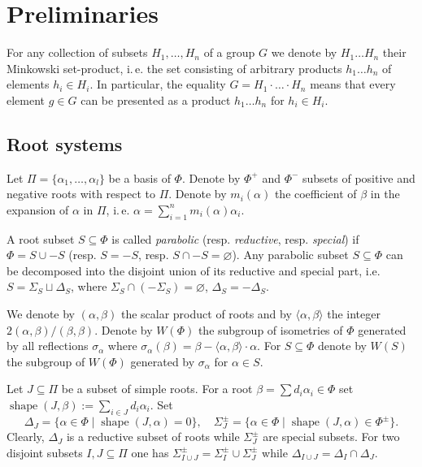 \documentclass[12pt]{amsart}
\numberwithin{equation}{section}
\theoremstyle{definition}
\DeclareMathOperator{\shape}{shape}
\begin{document}
\section{Preliminaries}\label{sec:prelim}
For any collection of subsets $H_1,\ldots, H_n$ of a group $G$ we denote by $H_1\ldots H_n$ their Minkowski set-product,
i.\,e. the set consisting of arbitrary products $h_1\ldots h_n$ of elements $h_i\in H_i$. In particular, the equality
$G = H_1\cdot\ldots\cdot H_n$ means that every element $g\in G$ can be presented as a product $h_1\ldots h_n$ for $h_i\in H_i$.

\subsection{Root systems}\label{sec:rootsys}
Let $\Pi=\{\alpha_1, \ldots, \alpha_l\}$ be a basis of $\Phi$. Denote by $\Phi^+$ and $\Phi^-$ subsets of positive and negative roots with respect to $\Pi$.
Denote by $m_i(\alpha)$ the coefficient of $\beta$ in the expansion of $\alpha$ in $\Pi$, i.\,e. $\alpha = \sum_{i=1}^n m_i(\alpha) \alpha_i$.

A root subset $S\subseteq \Phi$ is called {\it parabolic} (resp. {\it reductive}, resp. {\it special}) if $\Phi=S \cup -S$ (resp. $S = -S$, resp. $S \cap -S=\varnothing$).
Any parabolic subset $S \subseteq \Phi$ can be decomposed into the disjoint union of its reductive and special part, i.e. 
$S = \Sigma_S \sqcup \Delta_S$, where $\Sigma_S \cap (-\Sigma_S) = \varnothing$, $\Delta_S = -\Delta_S$.

We denote by $(\alpha, \beta)$ the scalar product of roots and by $\langle \alpha, \beta\rangle$ the integer $2(\alpha, \beta)/(\beta, \beta)$.
Denote by $W(\Phi)$ the subgroup of isometries of $\Phi$ generated by all reflections $\sigma_\alpha$ where $\sigma_\alpha(\beta)=\beta-\langle\alpha,\beta \rangle\cdot \alpha$.
For $S\subseteq \Phi$ denote by $W(S)$ the subgroup of $W(\Phi)$ generated by $\sigma_\alpha$ for $\alpha\in S$.

Let $J\subseteq \Pi$ be a subset of simple roots. 
For a root $\beta = \sum d_i\alpha_i \in \Phi$ set $\shape(J, \beta):=\sum\limits_{i\in J}d_i \alpha_i$.
Set $$\Delta_J = \{\alpha \in \Phi \mid \shape(J, \alpha)=0\},\quad \Sigma^\pm_J = \{\alpha \in \Phi \mid \shape(J, \alpha)\in\Phi^\pm \}.$$
Clearly, $\Delta_J$ is a reductive subset of roots while $\Sigma^\pm_J$ are special subsets.
For two disjoint subsets $I, J\subseteq \Pi$ one has $\Sigma^\pm_{I \cup J} = \Sigma^\pm_I\cup\Sigma^\pm_J$ while $\Delta_{I\cup J} = \Delta_I \cap \Delta_J$.
\end{document}
